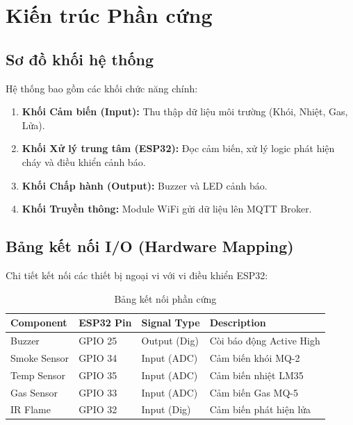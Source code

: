 \documentclass[12pt,a4paper]{report}
\begin{document}
\section{Kiến trúc Phần cứng}

\subsection{Sơ đồ khối hệ thống}
Hệ thống bao gồm các khối chức năng chính:
\begin{enumerate}
    \item \textbf{Khối Cảm biến (Input):} Thu thập dữ liệu môi trường (Khói, Nhiệt, Gas, Lửa).
    \item \textbf{Khối Xử lý trung tâm (ESP32):} Đọc cảm biến, xử lý logic phát hiện cháy và điều khiển cảnh báo.
    \item \textbf{Khối Chấp hành (Output):} Buzzer và LED cảnh báo.
    \item \textbf{Khối Truyền thông:} Module WiFi gửi dữ liệu lên MQTT Broker.
\end{enumerate}

\subsection{Bảng kết nối I/O (Hardware Mapping)}
Chi tiết kết nối các thiết bị ngoại vi với vi điều khiển ESP32:

\begin{table}[H]
\centering
\begin{tabular}{|l|l|l|l|}
\hline
\textbf{Component} & \textbf{ESP32 Pin} & \textbf{Signal Type} & \textbf{Description} \\ \hline
Buzzer & GPIO 25 & Output (Dig) & Còi báo động Active High \\ \hline
Smoke Sensor & GPIO 34 & Input (ADC) & Cảm biến khói MQ-2 \\ \hline
Temp Sensor & GPIO 35 & Input (ADC) & Cảm biến nhiệt LM35 \\ \hline
Gas Sensor & GPIO 33 & Input (ADC) & Cảm biến Gas MQ-5 \\ \hline
IR Flame & GPIO 32 & Input (Dig) & Cảm biến phát hiện lửa \\ \hline
\end{tabular}
\caption{Bảng kết nối phần cứng}
\end{table}

\end{document}
